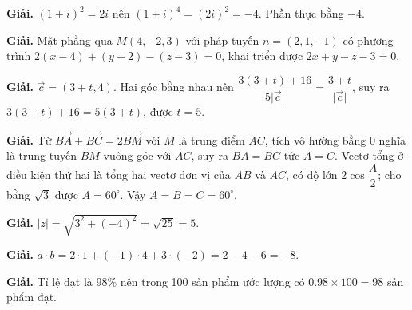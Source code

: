 \documentclass[11pt, a4paper]{article}
\begin{document}
\vspace{0.3cm}
\begin{dapan}[23 — Đáp án D]

\textbf{Giải.} $(1+i)^2=2i$ nên $(1+i)^4=(2i)^2=-4$. Phần thực bằng $-4$.


\end{dapan}
\vspace{0.3cm}
\begin{dapan}[24 — Đáp án B]

\textbf{Giải.} Mặt phẳng qua $M(4,-2,3)$ với pháp tuyến $n=(2,1,-1)$ có phương trình $2(x-4)+(y+2)-(z-3)=0$, khai triển được $2x+y-z-3=0$.


\end{dapan}
\vspace{0.3cm}
\begin{dapan}[25 — Đáp án A]

\textbf{Giải.} $\vec{c}=(3+t,4)$. Hai góc bằng nhau nên $\dfrac{3(3+t)+16}{5\lvert \vec{c} \rvert}=\dfrac{3+t}{\lvert \vec{c} \rvert}$, suy ra $3(3+t)+16=5(3+t)$, được $t=5$.


\end{dapan}
\vspace{0.3cm}
\begin{dapan}[26 — Đáp án D]

\textbf{Giải.} Từ $\overrightarrow{BA}+\overrightarrow{BC}=2\overrightarrow{BM}$ với $M$ là trung điểm $AC$, tích vô hướng bằng 0 nghĩa là trung tuyến $BM$ vuông góc với $AC$, suy ra $BA=BC$ tức $A=C$. Vectơ tổng ở điều kiện thứ hai là tổng hai vectơ đơn vị của $AB$ và $AC$, có độ lớn $2\cos\dfrac{A}{2}$; cho bằng $\sqrt{3}$ được $A=60^\circ$. Vậy $A=B=C=60^\circ$.


\end{dapan}
\vspace{0.3cm}
\begin{dapan}[27 — Đáp án C]

\textbf{Giải.} $\lvert z \rvert=\sqrt{3^2+(-4)^2}=\sqrt{25}=5$.


\end{dapan}
\vspace{0.3cm}
\begin{dapan}[28 — Đáp án C]

\textbf{Giải.} $a \cdot b=2 \cdot 1+(-1) \cdot 4+3 \cdot (-2)=2-4-6=-8$.


\end{dapan}
\vspace{0.3cm}
\begin{dapan}[29 — Đáp án A]

\textbf{Giải.} Tỉ lệ đạt là $98\%$ nên trong 100 sản phẩm ước lượng có $0.98 \times 100=98$ sản phẩm đạt.


\end{dapan}
\end{document}
